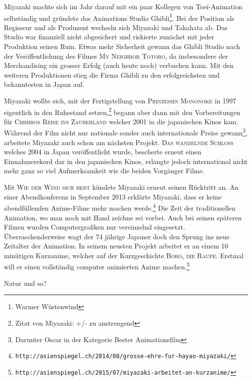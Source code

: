 Miyazaki machte sich im Jahr darauf mit ein paar Kollegen von Toei-Animation selbständig und gründete das Animations Studio Ghibli\footnote{Warmer Wüstenwind}. Bei der Position als Regisseur und als Produzent wechseln sich Miyazaki und Takahata ab. Das Studio war finanziell nicht abgesichert und riskierte zunächst mit jeder Produktion seinen Ruin. Etwas mehr Sicherheit gewann das Ghibli Studio nach der Veröffentlichung des Filmes \textsc{My Neighbor Totoro}, da insbesondere der Merchandising ein grosser Erfolg (auch heute noch) verbuchen kann. Mit den weiteren Produktionen stieg die Firma Ghibli zu den erfolgreichsten und bekanntesten in Japan auf.

Miyazaki wollte sich, mit der Fertigstellung von \textsc{Prinzessin Mononoke} in 1997 eigentlich in den Ruhestand setzen,\footnote{Zitat von Miyazaki: +/- zu anstrengend} begann aber dann mit den Vorbereitungen für \textsc{Chihiros Reise ins Zauberland} welcher 2001 in die japanischen Kinos kam. Während der Film nicht nur nationale sonder auch internationale Preise gewann\footnote{Darunter Oscar in der Kategorie Bester Animationsfilm}, arbeitete Miyazaki auch schon am nächsten Projekt. \textsc{Das wandelnde Schloss} welches 2004 in Japan veröffentlicht wurde, bescherte erneut einen Einnahmerekord dar in den japanischen Kinos, erlangte jedoch international nicht mehr ganz so viel Aufmerksamkeit wie die beiden Vorgänger Filme. 

Mit \textsc{Wie der Wind sich hebt} kündete Miyazaki erneut seinen Rücktritt an. An einer Abendkonferenz in September 2013 erklärte Miyazaki, dass er keine abendfüllenden Anime-Filme mehr machen werde.\footnote{\texttt{http://asienspiegel.ch/2014/08/grosse-ehre-fur-hayao-miyazaki/}} Die Zeit der traditionellen Animation, wo man noch mit Hand zeichne sei vorbei. Auch bei seinen späteren Filmen wurden Computergrafiken nur vereinzelnd eingesetzt. Überraschenderweise wagt der 74 jährige Japaner doch den Sprung ins neue Zeitalter der Animation. In seinem neusten Projekt arbeitet er an einem 10 minütigen Kurzanime, welcher auf der Kurzgeschichte \textsc{Boro, die Raupe}. Erstmal will er einen vollständig computer animierten Anime machen.\footnote{\texttt{http://asienspiegel.ch/2015/07/miyazaki-arbeitet-an-kurzanime/}}

Natur und so?

